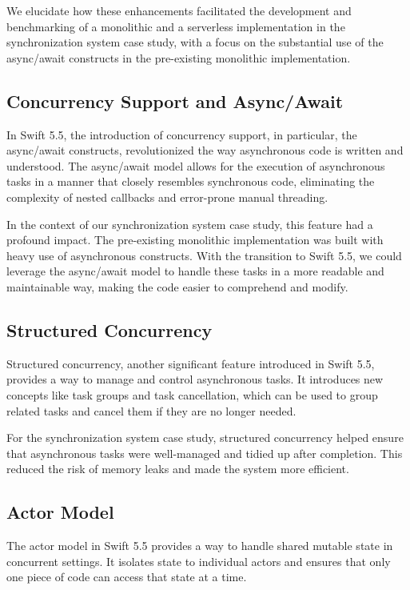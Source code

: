 We elucidate how these enhancements facilitated the development and benchmarking of a monolithic and a serverless implementation in the synchronization system case study, with a focus on the substantial use of the async/await constructs in the pre-existing monolithic implementation.
\subsection{Concurrency Support and Async/Await}
\label{subsec:ConcurrencySupport}

In Swift 5.5, the introduction of concurrency support, in particular, the async/await constructs, revolutionized the way asynchronous code is written and understood. The async/await model allows for the execution of asynchronous tasks in a manner that closely resembles synchronous code, eliminating the complexity of nested callbacks and error-prone manual threading.

In the context of our synchronization system case study, this feature had a profound impact. The pre-existing monolithic implementation was built with heavy use of asynchronous constructs. With the transition to Swift 5.5, we could leverage the async/await model to handle these tasks in a more readable and maintainable way, making the code easier to comprehend and modify.

\subsection{Structured Concurrency}
\label{subsec:StructuredConcurrency}

Structured concurrency, another significant feature introduced in Swift 5.5, provides a way to manage and control asynchronous tasks. It introduces new concepts like task groups and task cancellation, which can be used to group related tasks and cancel them if they are no longer needed.

For the synchronization system case study, structured concurrency helped ensure that asynchronous tasks were well-managed and tidied up after completion. This reduced the risk of memory leaks and made the system more efficient.

\subsection{Actor Model}
\label{subsec:ActorModel}

The actor model in Swift 5.5 provides a way to handle shared mutable state in concurrent settings. It isolates state to individual actors and ensures that only one piece of code can access that state at a time.

